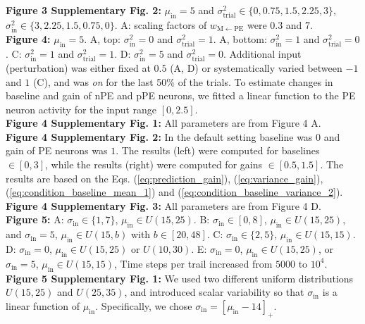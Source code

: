 \documentclass[10pt,a4paper]{article}
\begin{document}
%
\textbf{Figure 3 Supplementary Fig. 2:} $\mu_\mathrm{in} = 5$ and $\sigma^2_\mathrm{trial} \in \lbrace0, 0.75, 1.5, 2.25, 3\rbrace$, $\sigma^2_\mathrm{in} \in \lbrace 3, 2.25, 1.5,0.75, 0\rbrace$. A: scaling factors of $w_\mathrm{M\leftarrow PE}$ were 0.3 and 7.\\
%
\textbf{Figure 4:} $\mu_\mathrm{in} = 5$. A, top: $\sigma^2_\mathrm{in} = 0$ and $\sigma^2_\mathrm{trial} = 1$. A, bottom: $\sigma^2_\mathrm{in} = 1$ and $\sigma^2_\mathrm{trial} = 0$. C: $\sigma^2_\mathrm{in} = 1$ and $\sigma^2_\mathrm{trial} = 1$. D: $\sigma^2_\mathrm{in} = 5$ and $\sigma^2_\mathrm{trial} = 0$. Additional input (perturbation) was either fixed at $0.5$ (A, D) or systematically varied between $-1$ and $1$ (C), and was \textit{on} for the last 50\% of the trials. To estimate changes in baseline and gain of nPE and pPE neurons, we fitted a linear function to the PE neuron activity for the input range $[0, 2.5]$.\\
%
\textbf{Figure 4 Supplementary Fig. 1:} All parameters are from Figure 4 A.\\
%
\textbf{Figure 4 Supplementary Fig. 2:} In the default setting baseline was $0$ and gain of PE neurons was $1$. The results (left) were computed for baselines $\in [0, 3]$, while the results (right) were computed for gains $\in [0.5, 1.5]$. The results are based on the Eqs. (\ref{eq:prediction_gain}), (\ref{eq:variance_gain}), (\ref{eq:condition_baseline_mean_1}) and  (\ref{eq:condition_baseline_variance_2}). \\
%
\textbf{Figure 4 Supplementary Fig. 3:} All parameters are from Figure 4 D.\\
%
\textbf{Figure 5:} A: $\sigma_\mathrm{in} \in \lbrace1,7\rbrace$, $\mu_\mathrm{in} \in U(15, 25)$. B: $\sigma_\mathrm{in} \in [0,8]$, $\mu_\mathrm{in} \in U(15, 25)$, and $\sigma_\mathrm{in} = 5$, $\mu_\mathrm{in} \in U(15, b)$ with $b\in [20, 48]$. C: $\sigma_\mathrm{in} \in \lbrace2,5\rbrace$, $\mu_\mathrm{in} \in U(15, 15)$. D: $\sigma_\mathrm{in} = 0$, $\mu_\mathrm{in} \in U(15, 25)$ or $U(10, 30)$. E: $\sigma_\mathrm{in} = 0$, $\mu_\mathrm{in} \in U(15, 25)$, or $\sigma_\mathrm{in} = 5$, $\mu_\mathrm{in} \in U(15, 15)$,  Time steps per trail increased from $5000$ to $10^4$.\\
%
\textbf{Figure 5 Supplementary Fig. 1:} We used two different uniform distributions $U(15, 25)$ and  $U(25, 35)$, and introduced scalar variability so that $\sigma_\mathrm{in}$ is a linear function of $\mu_\mathrm{in}$. Specifically, we chose $\sigma_\mathrm{in} = \left[\mu_\mathrm{in} -14\right]_+$.
\end{document}
